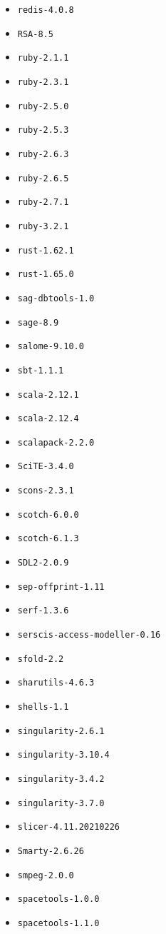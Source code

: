 \begin{multicols}{3}
\begin{itemize}
\item \verb|redis-4.0.8|
\item \verb|RSA-8.5|
\item \verb|ruby-2.1.1|
\item \verb|ruby-2.3.1|
\item \verb|ruby-2.5.0|
\item \verb|ruby-2.5.3|
\item \verb|ruby-2.6.3|
\item \verb|ruby-2.6.5|
\item \verb|ruby-2.7.1|
\item \verb|ruby-3.2.1|
\item \verb|rust-1.62.1|
\item \verb|rust-1.65.0|
\item \verb|sag-dbtools-1.0|
\item \verb|sage-8.9|
\item \verb|salome-9.10.0|
\item \verb|sbt-1.1.1|
\item \verb|scala-2.12.1|
\item \verb|scala-2.12.4|
\item \verb|scalapack-2.2.0|
\item \verb|SciTE-3.4.0|
\item \verb|scons-2.3.1|
\item \verb|scotch-6.0.0|
\item \verb|scotch-6.1.3|
\item \verb|SDL2-2.0.9|
\item \verb|sep-offprint-1.11|
\item \verb|serf-1.3.6|
\item \verb|serscis-access-modeller-0.16|
\item \verb|sfold-2.2|
\item \verb|sharutils-4.6.3|
\item \verb|shells-1.1|
\item \verb|singularity-2.6.1|
\item \verb|singularity-3.10.4|
\item \verb|singularity-3.4.2|
\item \verb|singularity-3.7.0|
\item \verb|slicer-4.11.20210226|
\item \verb|Smarty-2.6.26|
\item \verb|smpeg-2.0.0|
\item \verb|spacetools-1.0.0|
\item \verb|spacetools-1.1.0|

\end{itemize}
\end{multicols}

